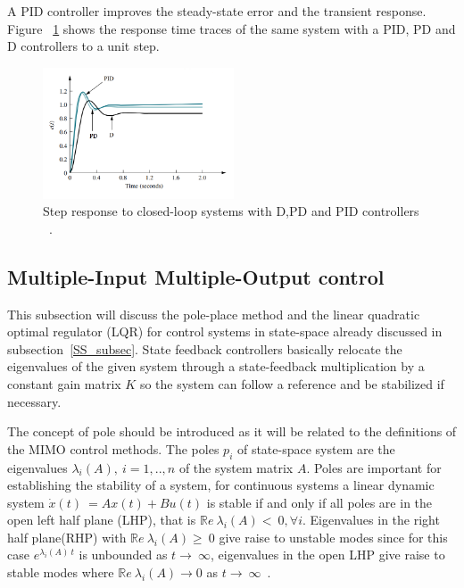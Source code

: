 A PID controller improves the steady-state error and the transient response. Figure ~\ref{PID} shows the response time traces  of the same system with a PID, PD and D controllers to a unit step.
\smallskip



\begin{figure}[h]
	\centering
	\includegraphics[width=0.505\textwidth]{Chp2/PID_comp.png}
	\caption{ Step response to closed-loop systems with D,PD and PID controllers ~\cite[Chapter~ 9]{Nise}. \label{PID}}
\end{figure}

\subsection{Multiple-Input Multiple-Output control}

This subsection will discuss the pole-place method and the linear quadratic optimal regulator (LQR) for control systems in state-space already discussed in subsection~\ref{SS_subsec}.  State feedback controllers basically relocate the eigenvalues of the given system through a state-feedback multiplication by a constant gain matrix $K$ so the system can follow a reference and be stabilized if necessary.
 \smallskip
 
 The concept of pole should be introduced as it will be related to  the definitions of the MIMO control methods. The poles $p_i$ of state-space system are the eigenvalues $\lambda_i(A),~i=1,..,n$ of the system matrix $A$. Poles are important for establishing the stability of a system, for continuous systems a linear dynamic system  $	\dot{x}(t)~=Ax(t)+Bu(t)$ is stable if and only if all poles are in the open left half plane (LHP), that is $\mathbb{R}e~{\lambda_i(A)}<~0, \forall i$. Eigenvalues in the right half plane(RHP) with  $\mathbb{R}e~{\lambda_i(A)}\geq~0$ give raise to unstable modes since for this case $e^{\lambda_i(A)~t}$ is unbounded as $t\rightarrow~\infty$,  eigenvalues in the open LHP give raise to stable modes where $\mathbb{R}e~{\lambda_i(A)} \rightarrow 0$ as $t\rightarrow~\infty$~\cite[Chapter~4]{Skogestad}.
\smallskip


